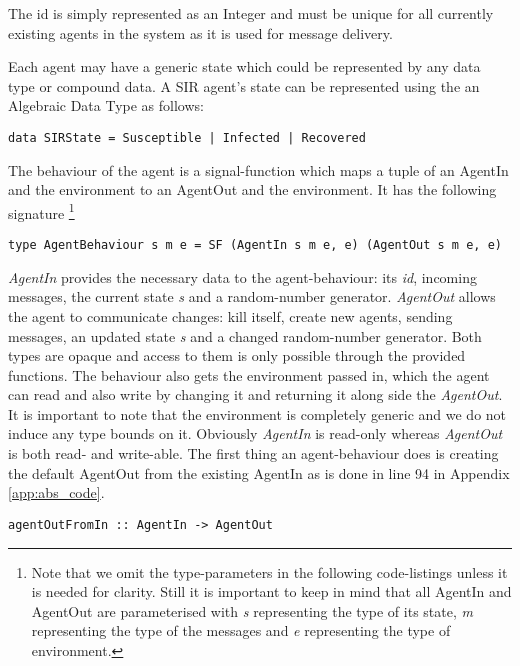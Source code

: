 The id is simply represented as an Integer and must be unique for all currently existing agents in the system as it is used for message delivery. %

Each agent may have a generic state which could be represented by any data type or compound data. A SIR agent's state can be represented using the an Algebraic Data Type as follows:
\begin{verbatim}
data SIRState = Susceptible | Infected | Recovered
\end{verbatim}

The behaviour of the agent is a signal-function which maps a tuple of an AgentIn and the environment to an AgentOut and the environment. It has the following signature \footnote{Note that we omit the type-parameters in the following code-listings unless it is needed for clarity. Still it is important to keep in mind that all AgentIn and AgentOut are parameterised with \textit{s} representing the type of its state, \textit{m} representing the type of the messages and \textit{e} representing the type of environment.} 
\begin{verbatim}
type AgentBehaviour s m e = SF (AgentIn s m e, e) (AgentOut s m e, e)
\end{verbatim}

\textit{AgentIn} provides the necessary data to the agent-behaviour: its \textit{id}, incoming messages, the current state \textit{s} and a random-number generator. \textit{AgentOut} allows the agent to communicate changes: kill itself, create new agents, sending messages, an updated state \textit{s} and a changed random-number generator. Both types are opaque and access to them is only possible through the provided functions. The behaviour also gets the environment passed in, which the agent can read and also write by changing it and returning it along side the \textit{AgentOut}. It is important to note that the environment is completely generic and we do not induce any type bounds on it. Obviously \textit{AgentIn} is read-only whereas \textit{AgentOut} is both read- and write-able. The first thing an agent-behaviour does is creating the default AgentOut from the existing AgentIn as is done in line 94 in Appendix \ref{app:abs_code}.

\begin{verbatim}
agentOutFromIn :: AgentIn -> AgentOut
\end{verbatim}

